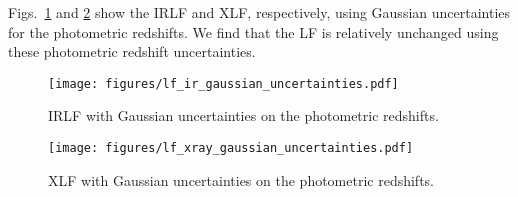 \documentclass[twocolumn, trackchanges]{aastex63}
\begin{document}
Figs.~\ref{fig:lf_ir_gauss} and \ref{fig:lf_x_gauss} show the IRLF and XLF, respectively, using Gaussian uncertainties for the photometric redshifts.
We find that the LF is relatively unchanged using these photometric redshift uncertainties.

\begin{figure}[h]
\centering
\texttt{[image: figures/lf\_ir\_gaussian\_uncertainties.pdf]}
\caption{IRLF with Gaussian uncertainties on the photometric redshifts.}
\label{fig:lf_ir_gauss}
\end{figure}

\begin{figure}[h]
\centering
\texttt{[image: figures/lf\_xray\_gaussian\_uncertainties.pdf]}
\caption{XLF with Gaussian uncertainties on the photometric redshifts.}
\label{fig:lf_x_gauss}
\end{figure}
\end{document}
